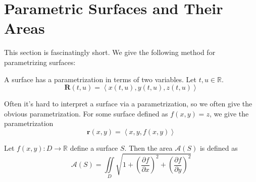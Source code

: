 \section{Parametric Surfaces and Their Areas}
This section is fascinatingly short. We give the following method for parametrizing surfaces:
\begin{definition}
    A surface has a parametrization in terms of two variables. Let \(t,u\in\mathbb{R}\). 
    \[
        \mathbf{R}(t,u)=\left\langle x(t,u),y(t,u),z(t,u) \right\rangle
    \]
\end{definition}
Often it's hard to interpret a surface via a parametrization, so we often give the obvious parametrization. For some surface defined as \(f(x,y)=z\), we give the parametrization 
\[
    \mathbf{r}(x,y)=\left\langle x,y,f(x,y) \right\rangle
\]
\begin{prev}
    Let \(f(x,y):D\to \mathbb{R}\) define a surface \(S\). Then the area \(\mathcal{A} (S)\) is defined as 
    \[
        \mathcal{A} (S)=\iint\limits_{D}\sqrt{1+\left( \frac{\partial f}{\partial x}  \right)^2 + \left( \frac{\partial f}{\partial y}  \right)^2  } 
    \]
\end{prev}
